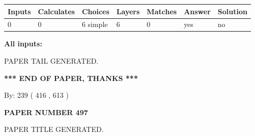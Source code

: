 \documentclass[12pt]{article}
\begin{document}
   
   
   
\noindent\begin{tabular}{|l|l|l|l|l|l|l|}
 \hline
Inputs & Calculates & Choices & Layers & Matches & Answer & Solution \\ \hline
 0  & 
 0  & 
 6
  simple  
  & 
 6  & 
 0  & 
  yes & 
  no 
  \\ \hline
 \end{tabular}
   
   
   
   
\noindent{}
   
   
   
   
\noindent\vspace{0.1in}\hspace{-0.08in} {\textbf{\Large{All inputs: }}}
   
   
   
   
   
   
 \vspace{0.2in}
 
   
   
\vspace{2.0in} PAPER TAIL GENERATED.
   
   
   
   
\vspace{1.0in} 
{\textbf{\large{ *** END OF PAPER, THANKS *** }}} 
   
   
\hspace{1.0in} By: 
 239 ( 416 ,  613 )
   
   
   
   
\newpage 
\setcounter{page}{ 
   497001 } 
   
   
   
   
 {\textbf{ \Large{ PAPER NUMBER  497  }}}
   
   
\vspace{0.2in}
   
   
   
   
   
   
   
   
 \vspace{0.2in}
 
 
 
 
   
   
 PAPER TITLE GENERATED.
   
   
   
\end{document}
